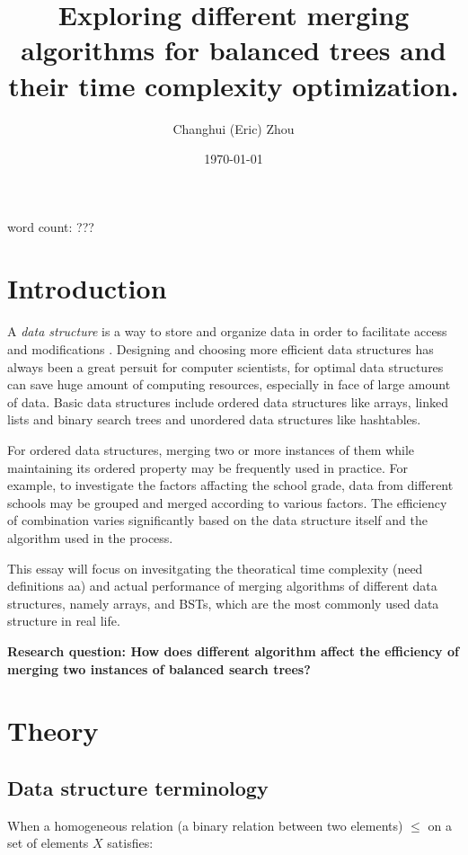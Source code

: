 \documentclass[12pt]{article}
\title{\textbf{Exploring different merging algorithms for balanced trees and their time complexity optimization.}}
\author{Changhui (Eric) Zhou}
\date{\today}
\begin{document}
\begin{titlepage}
    \maketitle
    \centering word count: ???
\end{titlepage}

\tableofcontents
\clearpage

\section{Introduction}

A \textit{data structure} is a way to store and organize data in order to facilitate access and modifications \cite{CLRS}. Designing and choosing more efficient data structures has always been a great persuit for computer scientists, for optimal data structures can save huge amount of computing resources, especially in face of large amount of data. Basic data structures include ordered data structures like arrays, linked lists and binary search trees and unordered data structures like hashtables. 

For ordered data structures, merging two or more instances of them while maintaining its ordered property may be frequently used in practice. For example, to investigate the factors affacting the school grade, data from different schools may be grouped and merged according to various factors. The efficiency of combination varies significantly based on the data structure itself and the algorithm used in the process. 

This essay will focus on invesitgating the theoratical time complexity (need definitions aa) and actual performance of merging algorithms of different data structures, namely arrays, and BSTs, which are the most commonly used data structure in real life. 

\textbf{Research question: How does different algorithm affect the efficiency of merging two instances of balanced search trees?}

\section{Theory}

\subsection{Data structure terminology}

When a homogeneous relation (a binary relation between two elements) $\le$ on a set of elements $X$ satisfies:
\end{document}
